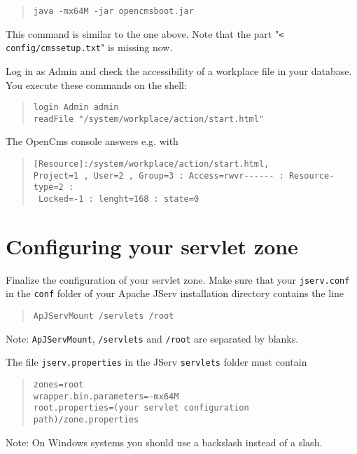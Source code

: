 \begin{quote}
\texttt{java -mx64M -jar opencmsboot.jar}
\end{quote}

This command is similar to the one above.
Note that the part "\texttt{< config/cmssetup.txt}" is missing now.

Log in as Admin and check the accessibility of a workplace file in your database. 
You execute these commands on the shell: 

\begin{quote}
\texttt{login Admin admin\\
readFile "/system/workplace/action/start.html"}
\end{quote}

The OpenCms console answers e.g. with

\begin{quote}
\begin{verbatim}
[Resource]:/system/workplace/action/start.html,
Project=1 , User=2 , Group=3 : Access=rwvr------ : Resource-type=2 : 
 Locked=-1 : lenght=168 : state=0
\end{verbatim}
\end{quote}

\section{Configuring your servlet zone}
Finalize the configuration of your servlet zone. Make sure that your \texttt{jserv.conf} in 
the \texttt{conf} folder of your Apache JServ installation directory contains the line

\begin{quote}
\begin{verbatim}
ApJServMount /servlets /root
\end{verbatim}
\end{quote}

Note: \texttt{ApJServMount}, \texttt{/servlets} and \texttt{/root} are separated by blanks.

The file \texttt{jserv.properties} in the JServ \texttt{servlets} folder must contain

\begin{quote}
\texttt{zones=root\\
wrapper.bin.parameters=-mx64M\\
root.properties=(your servlet configuration path)/zone.properties}
\end{quote}

Note: On Windows systems you should use a backslash instead of a slash. 


